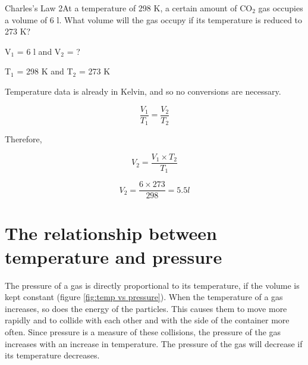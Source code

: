 \begin{wex}{Charles's Law 2}{At a temperature of 298 K, a certain amount of CO$_{2}$ gas occupies a volume of 6 l. What volume will the gas occupy if its temperature is reduced to 273 K?\\}

{
V$_{1}$ = 6 l and V$_{2}$ = ?

T$_{1}$ = 298 K and T$_{2}$ = 273 K\\
}

{
Temperature data is already in Kelvin, and so no conversions are necessary. \\
}

{

\begin{equation*}
\frac{V_{1}}{T_{1}} = \frac{V_{2}}{T_{2}}
\end{equation*}

Therefore,

\begin{equation*}
V_{2} = \frac{V_{1} \times T_{2}}{T_{1}}
\end{equation*}
}

{

\begin{equation*}
V_{2} = \frac{6 \times 273}{298} = 5.5 l
\end{equation*}
}
\end{wex}








\section{The relationship between temperature and pressure}
\label{sec:gases:pressure law}

The pressure of a gas is directly proportional to its temperature, if the volume is kept constant (figure \ref{fig:temp vs pressure}). When the temperature of a gas increases, so does the energy of the particles. This causes them to move more rapidly and to collide with each other and with the side of the container more often. Since pressure is a measure of these collisions, the pressure of the gas increases with an increase in temperature. The pressure of the gas will decrease if its temperature decreases.\\

